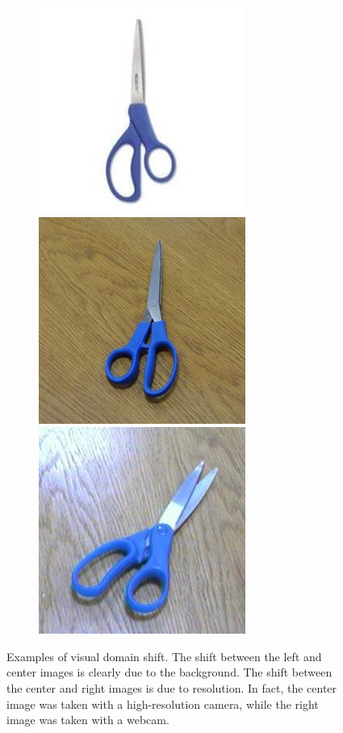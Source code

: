 \documentclass[../main.tex]{subfiles}
\begin{document}
    \begin{figure}[h!]
        \centering

        \begin{subfigure}{\linewidth}
        	\includegraphics[width=.3\linewidth]{img/amazon-scissor.png}\label{fig:amazon-scissor}\hfill
        	\includegraphics[width=.3\linewidth]{img/dslr-scissor.png}\label{fig:dslr-scissor}\hfill
            \includegraphics[width=.3\linewidth]{img/webcam-scissor.png}\label{fig:webcam-scissor}
        \end{subfigure}

        \caption{Examples of visual domain shift. The shift between the left and center images is clearly
            due to the background. The shift between the center and right images is due to resolution. In fact, the center
            image was taken with a high-resolution camera, while the right image was taken with a webcam.}\label{fig:domain-shift-office}
	   \end{figure}
\end{document}
